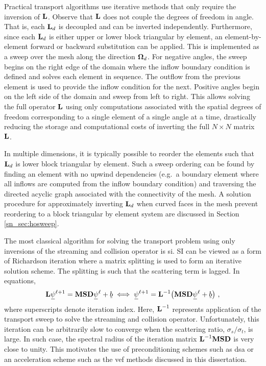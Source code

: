 \documentclass[../doc.tex]{subfiles}
\begin{document}
Practical transport algorithms use iterative methods that only require the inversion of $\boldsymbol{\mathrm{L}}$. Observe that $\boldsymbol{\mathrm{L}}$ does not couple the degrees of freedom in angle. That is, each $\boldsymbol{\mathrm{L}}_d$ is decoupled and can be inverted independently. Furthermore, since each $\boldsymbol{\mathrm{L}}_d$ is either upper or lower block triangular by element, an element-by-element forward or backward substitution can be applied. This is implemented as a sweep over the mesh along the direction $\boldsymbol{\Omega}_d$. For negative angles, the sweep begins on the right edge of the domain where the inflow boundary condition is defined and solves each element in sequence. The outflow from the previous element is used to provide the inflow condition for the next. Positive angles begin on the left side of the domain and sweep from left to right. This allows solving the full operator $\boldsymbol{\mathrm{L}}$ using only computations associated with the spatial degrees of freedom corresponding to a single element of a single angle at a time, drastically reducing the storage and computational costs of inverting the full $N\times N$ matrix $\boldsymbol{\mathrm{L}}$. 

In multiple dimensions, it is typically possible to reorder the elements such that $\boldsymbol{\mathrm{L}}_d$ is lower block triangular by element. Such a sweep ordering can be found by finding an element with no upwind dependencies (e.g.~a boundary element where all inflows are computed from the inflow boundary condition) and traversing the directed acyclic graph associated with the connectivity of the mesh. A solution procedure for approximately inverting $\boldsymbol{\mathrm{L}}_d$ when curved faces in the mesh prevent reordering to a block triangular by element system are discussed in Section \ref{sn_sec:hosweep}.  

The most classical algorithm for solving the transport problem using only inversions of the streaming and collision operator is \gls{si}. SI can be viewed as a form of Richardson iteration where a matrix splitting is used to form an iterative solution scheme. The splitting is such that the scattering term is lagged. In equations, 
	\begin{equation} \label{sn:sourceiteration}
		\mat{L}\ubar{\psi}^{\ell+1} = \mat{M}\mat{S}\mat{D}\ubar{\psi}^\ell + \ubar{b} \iff \ubar{\psi}^{\ell+1} = \mat{L}^{-1}\!\paren{\mat{M}\mat{S}\mat{D}\ubar{\psi}^\ell + \ubar{b}} \,, 
	\end{equation}
where superscripts denote iteration index. Here, $\boldsymbol{\mathrm{L}}^{-1}$ represents application of the transport sweep to solve the streaming and collision operator. Unfortunately, this iteration can be arbitrarily slow to converge when the scattering ratio, $\sigma_s/\sigma_t$, is large. In such case, the spectral radius of the iteration matrix $\boldsymbol{\mathrm{L}}^{-1}\boldsymbol{\mathrm{M}}\boldsymbol{\mathrm{S}}\boldsymbol{\mathrm{D}}$ is very close to unity. This motivates the use of preconditioning schemes such as \gls{dsa} or an acceleration scheme such as the \gls{vef} methods discussed in this dissertation. 
\end{document}
